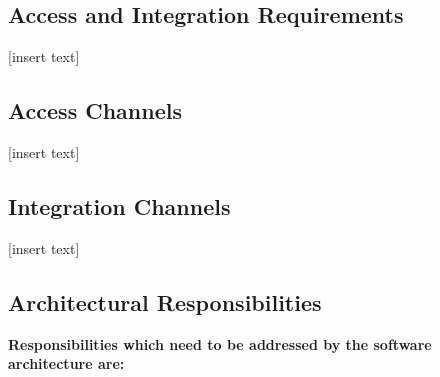 \documentclass[11pt]{article}
\begin{document}


\tableofcontents	%
\newpage

	\newpage
	\begin{center}
	\section{\textbf{\huge{Access and Integration Requirements}}}
	\end{center}
	
	[insert text]

	\newpage
	\begin{center}
	\section{\textbf{\huge{Access Channels}}}
	\end{center}
	
	[insert text]
		
	\newpage
	\begin{center}
	\section{\textbf{\huge{Integration Channels}}}
	\end{center}
	
	[insert text]

	\newpage
	\begin{center}
	\section{\textbf{\huge{Architectural Responsibilities}}}
	\end{center}
	
	\textbf{Responsibilities which need to be addressed by the software architecture are:}
	\\
	
\end{document}
